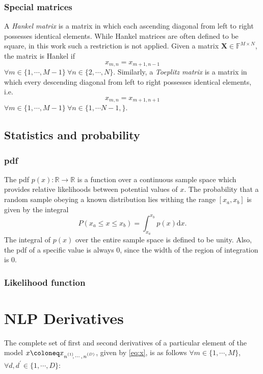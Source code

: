 \subsubsection{Special matrices}
A \emph{Hankel matrix} is a matrix in which each ascending diagonal from left to right
possesses identical elements. While Hankel matrices are often defined to be square, in
this work such a restriction is not applied. Given a matrix $\symbf{X} \in
\mathbb{F}^{M \times N}$, the matrix is Hankel if
\begin{equation}
    x_{m,n} = x_{m+1,n-1}
\end{equation}
$\forall m \in \lbrace 1, \cdots, M-1 \rbrace
\ \forall n \in \lbrace 2, \cdots, N \rbrace$.
Similarly, a \emph{Toeplitz matrix} is a matrix in which every descending
diagonal from left to right possesses identical elements, i.e.
\begin{equation}
    x_{m,n} = x_{m+1,n+1}
\end{equation}
$\forall m \in \lbrace 1, \cdots, M-1 \rbrace\ \forall n
\in \lbrace 1, \cdots N-1, \rbrace$.

\subsection{Statistics and probability}


\subsubsection{\Acl{pdf}}
The \ac{pdf} $p(x) : \mathbb{R} \rightarrow \mathbb{R}$ is a function over a
continuous sample space which provides relative likelihoods between potential
values of $x$.  The probability that a random sample obeying a known
distribution lies withing the range $[x_a, x_b]$ is given by the integral
\begin{equation}
    P(x_a \leq x \leq x_b) = \int_{x_a}^{x_b} p(x) \mathrm{d}x.
\end{equation}
The integral of $p(x)$ over the entire sample space is defined to be
unity. Also, the \ac{pdf} of a specific value is always $0$, since the width of
the region of integration is $0$.

\subsubsection{Likelihood function}

\section{NLP Derivatives}
\label{sec:derivatives}
The complete set of first and second derivatives of a particular element of the
model $x \coloneq \xnonenD$, given by \cref{eq:x}, is as follows
$\forall m \in \lbrace 1, \cdots, M \rbrace$,
$\forall d, d^{\prime} \in \lbrace 1, \cdots, D \rbrace$:
